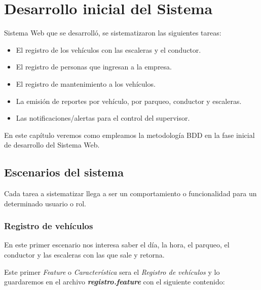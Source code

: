 

\chapter{Desarrollo inicial del Sistema}

 Sistema Web que se desarrolló, se sistematizaron las siguientes
tareas:

\begin{itemize}
    \item El registro de los vehículos con las escaleras y el conductor.
    \item El registro de personas que ingresan a la empresa.
    \item El registro de mantenimiento a los vehículos.
    \item La emisión de reportes por vehículo, por parqueo, conductor y escaleras.
    \item Las notificaciones/alertas para el control del supervisor.
\end{itemize}

En este capítulo veremos como empleamos la metodología BDD en la fase inicial de
desarrollo del Sistema Web.


\section{Escenarios del sistema}
Cada tarea a sistematizar llega a ser un comportamiento o funcionalidad para un
determinado usuario o rol.

\subsection{Registro de vehículos}
En este primer escenario nos interesa saber el día, la hora, el parqueo, el conductor
y las escaleras con las que sale y retorna.

Este primer {\it Feature} o {\it Característica} sera el {\it Registro de vehículos}
y lo guardaremos en el archivo {\it \bfseries registro.feature} con el siguiente contenido:

